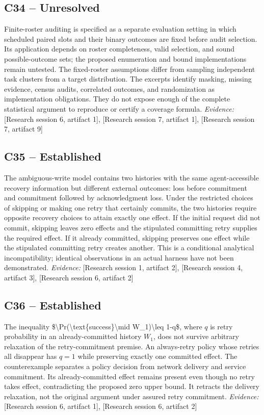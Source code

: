 \documentclass[11pt]{article}
\begin{document}
\subsection{C34 -- Unresolved}
Finite-roster auditing is specified as a separate evaluation setting in which scheduled paired slots and their binary outcomes are fixed before audit selection. Its application depends on roster completeness, valid selection, and sound possible-outcome sets; the proposed enumeration and bound implementations remain untested.
The fixed-roster assumptions differ from sampling independent task clusters from a target distribution. The excerpts identify masking, missing evidence, census audits, correlated outcomes, and randomization as implementation obligations. They do not expose enough of the complete statistical argument to reproduce or certify a coverage formula.
\textit{Evidence: }[Research session 6, artifact 1], [Research session 7, artifact 1], [Research session 7, artifact 9]
\subsection{C35 -- Established}
The ambiguous-write model contains two histories with the same agent-accessible recovery information but different external outcomes: loss before commitment and commitment followed by acknowledgment loss. Under the restricted choices of skipping or making one retry that certainly commits, the two histories require opposite recovery choices to attain exactly one effect.
If the initial request did not commit, skipping leaves zero effects and the stipulated committing retry supplies the required effect. If it already committed, skipping preserves one effect while the stipulated committing retry creates another. This is a conditional analytical incompatibility; identical observations in an actual harness have not been demonstrated.
\textit{Evidence: }[Research session 1, artifact 2], [Research session 4, artifact 3], [Research session 6, artifact 2]
\subsection{C36 -- Established}
The inequality \$\textbackslash{}Pr(\textbackslash{}text\{success\}\textbackslash{}mid W\_1)\textbackslash{}leq 1-q\$, where $q$ is retry probability in an already-committed history $W_1$, does not survive arbitrary relaxation of the retry-commitment premise. An always-retry policy whose retries all disappear has $q=1$ while preserving exactly one committed effect.
The counterexample separates a policy decision from network delivery and service commitment. Its already-committed effect remains present even though no retry takes effect, contradicting the proposed zero upper bound. It retracts the delivery relaxation, not the original argument under assured retry commitment.
\textit{Evidence: }[Research session 6, artifact 1], [Research session 6, artifact 2]
\end{document}
